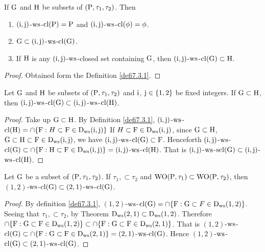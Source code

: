 \begin{thm}\label{thm7.3.2}
If $\mathrm{G}$ and $\mathrm{H}$ be subsets of $(\mathrm{P}, \tau_1, \tau_2 )$. Then
\begin{enumerate}[(1)]
\item $(\mathrm{i}, \mathrm{j})$-$\mathrm{ws}$-$\mathrm{cl}(\mathrm{P})=\mathrm{P}$ and $(\mathrm{i}, \mathrm{j})$-$\mathrm{ws}$-$\mathrm{cl}(\phi)=\phi$.
\item $\mathrm{G} \subset (\mathrm{i}, \mathrm{j})$-$\mathrm{ws}$-$\mathrm{cl}(\mathrm{G})$.
\item If $\mathrm{H}$ is any $(\mathrm{i}, \mathrm{j})$-$\mathrm{ws}$-closed set containing $\mathrm{G}$, then $(\mathrm{i}, \mathrm{j})$-$\mathrm{ws}$-$\mathrm{cl}(\mathrm{G})\subset\mathrm{H}$.
\end{enumerate}
\end{thm}

\begin{proof}
Obtained form the Definition \ref{defi7.3.1}.
\end{proof}

\begin{thm}\label{thm7.3.3}
Let $\mathrm{G}$ and $\mathrm{H}$ be subsets of $(\mathrm{P}, \tau_1, \tau_2 )$ and $\mathrm{i}$, $\mathrm{j}\in\{1, 2\}$ be fixed integers. If $\mathrm{G} \subset \mathrm{H}$, then $(\mathrm{i}, \mathrm{j})$-$\mathrm{ws}$-$\mathrm{cl}(\mathrm{G}) \subset (\mathrm{i}, \mathrm{j})$-$\mathrm{ws}$-$\mathrm{cl}(\mathrm{H})$.
\end{thm}

\begin{proof}
Take up $\mathrm{G}\subset\mathrm{H}$. By Definition \ref{defi7.3.1}, $(\mathrm{i}, \mathrm{j})$-$\mathrm{ws}$-$\mathrm{cl}(\mathrm{H})=\cap \{\mathrm{F}:H\subset\mathrm{F}\in\mathrm{D}_{\mathrm{ws}}(\mathrm{i}, \mathrm{j})\}$ If $H\subset\mathrm{F}\in\mathrm{D}_{\mathrm{ws}} (\mathrm{i},\mathrm{j})$, since $\mathrm{G}\subset\mathrm{H}$, $\mathrm{G}\subset\mathrm{H}\subset\mathrm{F}\in\mathrm{D}_{\mathrm{ws}} (\mathrm{i}, \mathrm{j})$, we have $(\mathrm{i}, \mathrm{j})$-$\mathrm{ws}$-$\mathrm{cl}(\mathrm{G}) \subset \mathrm{F}$. Henceforth $(\mathrm{i}, \mathrm{j})$-$\mathrm{ws}$-$\mathrm{cl}(\mathrm{G}) \subset \cap \{\mathrm{F}:\mathrm{H}\subset\mathrm{F}\in\mathrm{D}_{\mathrm{ws}} (\mathrm{i}, \mathrm{j})\}= (\mathrm{i}, \mathrm{j})$-$\mathrm{ws}$-$\mathrm{cl}(\mathrm{H})$. That is $(\mathrm{i}, \mathrm{j})$-$\mathrm{ws}$-$\mathrm{scl}(\mathrm{G}) \subset (\mathrm{i}, \mathrm{j})$-$\mathrm{ws}$-$\mathrm{cl}(\mathrm{H})$.
\end{proof}

\begin{thm}\label{thm7.3.4}
Let $\mathrm{G}$ be a subset of $(\mathrm{P}, \tau_1, \tau_2 )$. If $\tau_1, \subset \tau_2$ and $\mathrm{WO}(\mathrm{P}, \tau_1 ) \subset \mathrm{WO}(\mathrm{P}, \tau_2 )$, then $(1,2)$-$\mathrm{ws}$-$\mathrm{cl}(\mathrm{G})\subset (2, 1)$-$\mathrm{ws}$-$\mathrm{cl}(\mathrm{G})$.
\end{thm}

\begin{proof}
By definition \ref{defi7.3.1}, $(1,2)$-$\mathrm{ws}$-$\mathrm{cl}(\mathrm{G})=\cap \{\mathrm{F}:\mathrm{G}\subset F\in\mathrm{D}_{\mathrm{ws}} (1, 2)\}$. Seeing that $\tau_1, \subset \tau_2$, by Theorem \label{thm7.2.34} $\mathrm{D}_{\mathrm{ws}} (2, 1) \subset \mathrm{D}_{\mathrm{ws}} (1, 2)$. Therefore $\cap \{\mathrm{F}:\mathrm{G}\subset \mathrm{F}\in\mathrm{D}_{\mathrm{ws}} (1, 2)\}\subset \cap \{\mathrm{F}:\mathrm{G}\subset \mathrm{F}\in\mathrm{D}_{\mathrm{ws}} (2,1)\}$. That is $(1, 2)$-$\mathrm{ws}$-$\mathrm{cl}(\mathrm{G})\subset \cap \{\mathrm{F}:\mathrm{G}\subset \mathrm{F}\in\mathrm{D}_{\mathrm{ws}} (2, 1)\}= (2, 1)$-$\mathrm{ws}$-$\mathrm{cl}(\mathrm{G})$. Hence $(1, 2)$-$\mathrm{ws}$-$\mathrm{cl}(\mathrm{G})\subset (2, 1)$-$\mathrm{ws}$-$\mathrm{cl}(\mathrm{G})$.
\end{proof}

